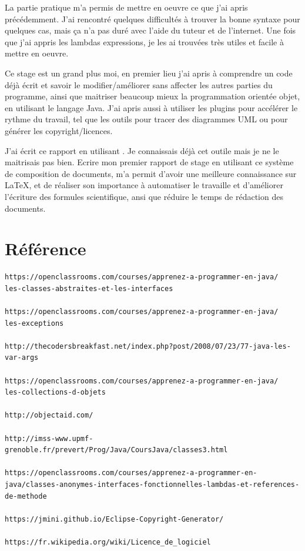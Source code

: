 \documentclass[12pt]{report}
\begin{document}
La partie pratique m'a permis de mettre en oeuvre ce que j'ai apris précédemment. J'ai rencontré quelques difficultés à trouver la bonne syntaxe pour quelques cas, mais ça n'a pas duré avec l'aide du tuteur et de l'internet. Une fois que j'ai appris les lambdas expressions, je les ai trouvées très utiles et facile à mettre en oeuvre. \newline

Ce stage est un grand plus moi, en premier lieu j'ai apris à comprendre un code déjà écrit et savoir le modifier/améliorer sans affecter les autres parties du programme, ainsi que maitriser beaucoup mieux la programmation orientée objet, en utilisant le langage Java. J'ai apris aussi à utiliser les plugins pour accélérer le rythme du travail, tel que les outils pour tracer des diagrammes UML ou pour générer les copyright/licences.\newline

J'ai écrit ce rapport en utilisant \LaTaX. Je connaissais déjà cet outile mais je ne le maitrisais pas bien. Ecrire mon premier rapport de stage en utilisant ce système de composition de documents, m'a permit d'avoir une meilleure connaissance sur \LaTeX, et de réaliser son importance à automatiser le travaille et d'améliorer l'écriture des formules scientifique, ansi que réduire le temps de rédaction des documents.


\newpage
\section{Référence}
\begin{verbatim}
https://openclassrooms.com/courses/apprenez-a-programmer-en-java/
les-classes-abstraites-et-les-interfaces

https://openclassrooms.com/courses/apprenez-a-programmer-en-java/
les-exceptions

http://thecodersbreakfast.net/index.php?post/2008/07/23/77-java-les-var-args

https://openclassrooms.com/courses/apprenez-a-programmer-en-java/
les-collections-d-objets

http://objectaid.com/

http://imss-www.upmf-grenoble.fr/prevert/Prog/Java/CoursJava/classes3.html

https://openclassrooms.com/courses/apprenez-a-programmer-en-java/classes-anonymes-interfaces-fonctionnelles-lambdas-et-references-de-methode

https://jmini.github.io/Eclipse-Copyright-Generator/

https://fr.wikipedia.org/wiki/Licence_de_logiciel
\end{verbatim}
\end{document}
